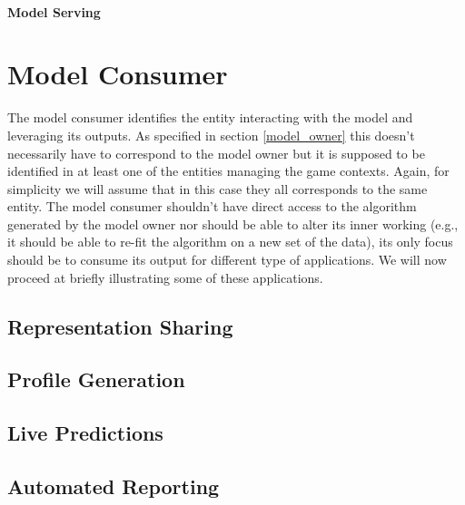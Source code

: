 \paragraph*{Model Serving} \lorem

\section{Model Consumer}
The model consumer identifies the entity interacting with the model and leveraging its outputs. As specified in section \ref{model_owner} this doesn't necessarily have to correspond to the model owner but it is supposed to be identified in at least one of the entities managing the game contexts. Again, for simplicity we will assume that in this case they all corresponds to the same entity. The model consumer shouldn't have direct access to the algorithm generated by the model owner nor should be able to alter its inner working (e.g., it should be able to re-fit the algorithm on a new set of the data), its only focus should be to consume its output for different type of applications. We will now proceed at briefly illustrating some of these applications.

\subsection{Representation Sharing}
\lorem
\subsection{Profile Generation}
\lorem
\subsection{Live Predictions}
\lorem
\subsection{Automated Reporting}
\lorem

